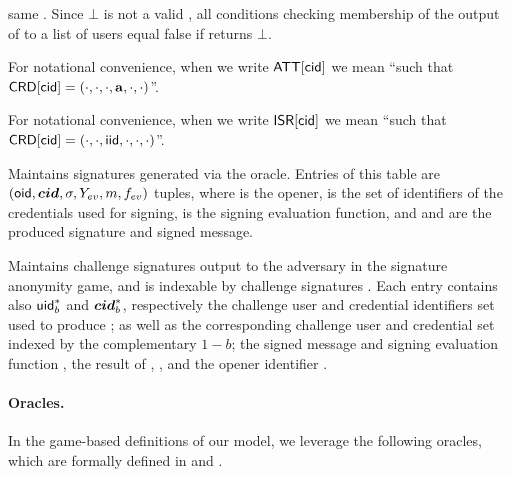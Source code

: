 \begin{description}
  same \uid. Since $\bot$ is not a valid \uid, all conditions checking
  membership of the output of \OWNR to a list of users equal false if \OWNR
  returns $\bot$.
\item[\ATTR.] For notational convenience, when we write $\mathsf{ATT}[\mathsf{cid}]$ we mean
  ``\attrs such that $\mathsf{CRD}[\mathsf{cid}] = (\cdot,\cdot,\cdot,\mathbf{a},\cdot,\cdot)$''.
\item[\ISR.] For notational convenience, when we write $\mathsf{ISR}[\mathsf{cid}]$ we mean
  ``\iid such that $\mathsf{CRD}[\mathsf{cid}] = (\cdot,\cdot,\mathsf{iid},\cdot,\cdot,\cdot)$''.
\item[\SIG.] Maintains signatures generated via the \SIGN oracle. Entries of
  this table are $(\mathsf{oid},\boldsymbol{cid},\sigma,Y_{ev},m,f_{ev})$ tuples, where \oid is
  the opener, \scid is the set of identifiers of the credentials used for
  signing, \feval is the signing evaluation function, and \sig and \msg are the
  produced signature and signed message.
\item[\CSIG.] Maintains challenge signatures output to the adversary in the
  signature anonymity game, and is indexable by challenge signatures \csig.
  Each entry contains also $\mathsf{uid}^*_b$ and $\boldsymbol{cid}^*_b$, respectively the challenge
  user  and credential identifiers set used to produce \csig; as well as the
  corresponding challenge user and credential set indexed by the complementary
  $1-b$; the signed message \msg and signing evaluation function \feval, the
  result of \feval, \Yeval, and the opener identifier \oid.
\end{description}

\paragraph{Oracles.} %
In the game-based definitions of our \UAS model, we leverage the following
oracles, which are formally defined in  and
. 

